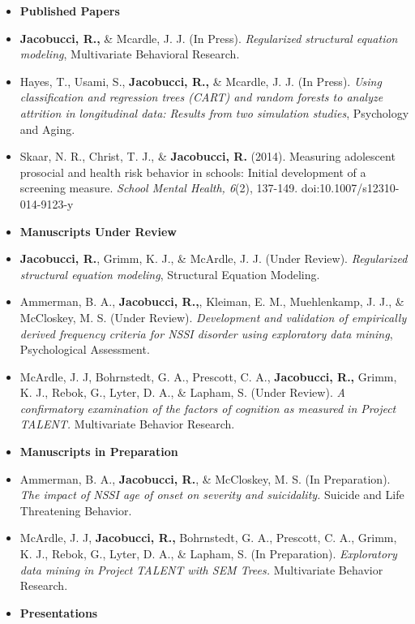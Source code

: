 \documentclass[letterpaper,10pt]{article}
\begin{document}
\begin{itemize}
\item[]{\textbf{\large{Published Papers}}}
%
\item[]\textbf{Jacobucci, R.,} \& Mcardle, J. J. (In Press). \emph{Regularized structural equation modeling}, Multivariate Behavioral Research.
%
\item[]Hayes, T., Usami, S., \textbf{Jacobucci, R.,} \& Mcardle, J. J. (In Press). \emph{Using classification and regression trees (CART) and random forests to analyze attrition in longitudinal data: Results from two simulation studies}, Psychology and Aging.
%
\item[]Skaar, N. R., Christ, T. J., \& \textbf{Jacobucci, R.} (2014). Measuring adolescent prosocial and health risk behavior in schools: Initial development of a screening measure. \emph{School Mental Health, 6}(2), 137-149. doi:10.1007/s12310-014-9123-y
%
\item[]{\textbf{\large{Manuscripts Under Review}}}
%
\item[]\textbf{Jacobucci, R.}, Grimm, K. J., \& McArdle, J. J. (Under Review). \emph{Regularized structural equation modeling}, Structural Equation Modeling.
%
\item[]Ammerman, B. A., \textbf{Jacobucci, R.,}, Kleiman, E. M., Muehlenkamp, J. J., \& McCloskey, M. S. (Under Review). \emph{Development and validation of empirically derived frequency criteria for NSSI disorder using exploratory data mining}, Psychological Assessment.
%
\item[]McArdle, J. J, Bohrnstedt, G. A., Prescott, C. A., \textbf{Jacobucci, R.,} Grimm, K. J., Rebok, G., Lyter, D. A., \& Lapham, S. (Under Review). \emph{A confirmatory examination of the factors of cognition as measured in Project TALENT.} Multivariate Behavior Research.
%
\item[]{\textbf{\large{Manuscripts in Preparation}}}
%
\item[]Ammerman, B. A., \textbf{Jacobucci, R.}, \& McCloskey, M. S. (In Preparation). \emph{The impact of NSSI age of onset on severity and suicidality.} Suicide and Life Threatening Behavior.
%
\item[]McArdle, J. J, \textbf{Jacobucci, R.,} Bohrnstedt, G. A., Prescott, C. A., Grimm, K. J., Rebok, G., Lyter, D. A., \& Lapham, S. (In Preparation). \emph{Exploratory data mining in Project TALENT with SEM Trees.} Multivariate Behavior Research.
%

%
\item[]{\textbf{\large{Presentations}}}
%


\end{itemize}
\end{document}
